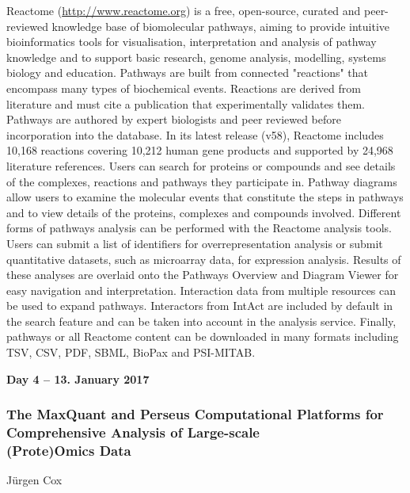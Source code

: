 Reactome (\url{http://www.reactome.org}) is a free, open-source, curated and
peer-reviewed knowledge base of biomolecular pathways, aiming to provide
intuitive bioinformatics tools for visualisation, interpretation and analysis of
pathway knowledge and to support basic research, genome analysis, modelling,
systems biology and education. Pathways are built from connected "reactions"
that encompass many types of biochemical events. Reactions are derived from
literature and must cite a publication that experimentally validates them.
Pathways are authored by expert biologists and peer reviewed before
incorporation into the database. In its latest release (v58), Reactome
includes 10,168 reactions covering 10,212 human gene products and supported by
24,968 literature references. Users can search for proteins or compounds and see
details of the complexes, reactions and pathways they participate in. Pathway
diagrams allow users to examine the molecular events that constitute the steps
in pathways and to view details of the proteins, complexes and compounds
involved. Different forms of pathways analysis can be performed with the
Reactome analysis tools. Users can submit a list of identifiers for
overrepresentation analysis or submit quantitative datasets, such as microarray
data, for expression analysis. Results of these analyses are overlaid onto the
Pathways Overview and Diagram Viewer for easy navigation and interpretation.
Interaction data from multiple resources can be used to expand pathways.
Interactors from IntAct are included by default in the search feature and can be
taken into account in the analysis service. Finally, pathways or all Reactome
content can be downloaded in many formats including TSV, CSV, PDF, SBML, BioPax
and PSI-MITAB.



\vspace{1cm}
\noindent\textbf{Day 4 -- 13. January 2017}

\subsubsection*{\color{eubicRed} The MaxQuant and Perseus Computational Platforms for Comprehensive Analysis of Large-scale\\ (Prote)Omics Data}
{\color{eubicGray}J\"urgen Cox}

